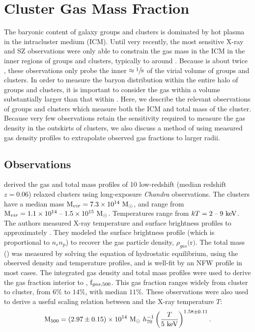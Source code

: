 \section{Cluster Gas Mass Fraction}
\label{sec:Gas}
The baryonic content of galaxy groups and clusters is dominated by hot
plasma in the intracluster medium (ICM). Until very recently, the most
sensitive X-ray and SZ observations were only able to constrain the
gas mass in the ICM in the inner regions of groups and clusters,
typically to around \rfive{} . Because \rvir{} is about twice \rfive{}, these
observations only probe the inner $\approx \sfrac{1}{8}$ of the virial
volume of groups and clusters. In order to measure the baryon
distribution within the entire halo of groups and clusters, it is
important to consider the gas within a volume substantially larger
than that within \rfive{}. Here, we describe the relevant observations
of groups and clusters which measure both the ICM and total mass of
the cluster. Because very few observations retain the sensitivity
required to measure the gas density in the outskirts of clusters, we
also discuss a method of using measured gas density profiles to
extrapolate observed gas fractions to larger radii.

\subsection{Observations}
\label{sec:Gas.Observations}
\textbf{\citet{Vikhlinin2006}} derived the gas and total mass profiles
of 10 low-redshift (median redshift $z = 0.06$) relaxed clusters using
long-exposure \textit{Chandra} observations. The clusters have a
median mass $\textrm{M\ensuremath{_{vir}}} = 7.3 \times 10^{14}~\textrm{M}_\odot$, and range from $\textrm{M\ensuremath{_{vir}}} =
1.1\times 10^{14}\;\textrm{--}\;1.5 \times 10^{15}~\textrm{M}_\odot$. Temperatures range from
$kT = 2\;\textrm{--}\;9~\textrm{keV}$. The authors measured X-ray temperature
and surface brightness profiles to approximately \rfive{}. They
modeled the surface brightness profile (which is proportional to
$n_en_p$) to recover the gas particle density,
$\rho_{gas}($r$)$. The total mass (\Mfive) was measured by solving the
equation of hydrostatic equilibrium, using the observed density and
temperature profiles, and is well-fit by an NFW profile in most
cases. The integrated gas density and total mass profiles were used to
derive the gas fraction interior to \rfive{}, $\textrm{f\ensuremath{_{gas,500}}}$. This gas
fraction ranges widely from cluster to cluster, from $6\%$ to $14\%$,
with median $11\%$. These observations were also used to derive a
useful scaling relation between \Mfive{} and the X-ray temperature $T$:
\begin{equation}
\label{eq:M-T}
\textrm{M\ensuremath{_{500}}}{} = (2.97 \pm 0.15)\times 10^{14}~\textrm{M}_\odot~h_{70}^{-1}
\left(\frac{T}{5~\textrm{keV}}\right)^{1.58 \pm 0.11}.
\end{equation}

